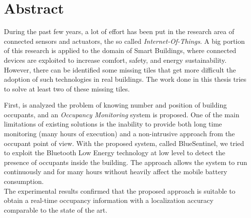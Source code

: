 %
%
\cleardoublepage
%
%
%
\begingroup
\let\cleardoublepage\relax
\let\cleardoublepage\relax
%
\chapter*{Abstract}
%
During the past few years, a lot of effort has been put in the research area of connected sensors and actuators, the so called \emph{Internet-Of-Things}. A big portion of this research is applied to the domain of Smart Buildings, where connected devices are exploited to increase comfort, safety, and energy sustainability.
However, there can be identified some missing tiles that get more difficult the adoption of such technologies in real buildings.
The work done in this thesis tries to solve at least two of these missing tiles.

First, is analyzed the problem of knowing number and position of building occupants, and an \emph{Occupancy Monitoring} system is proposed. One of the main limitations of existing solutions is the inability to provide both long time monitoring (many hours of execution) and a non-intrusive approach from the occupant point of view.
With the proposed system, called BlueSentinel, we tried to exploit the Bluetooth Low Energy technology at low level to detect the presence of occupants inside the building. The approach allows the system to run continuously and for many hours without heavily affect the mobile battery consumption.\\
The experimental results confirmed that the proposed approach is suitable to obtain a real-time occupancy information with a localization accuracy comparable to the state of the art.

